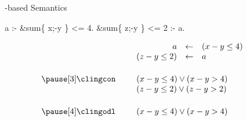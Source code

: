 \begin{frame}[fragile]{\HTC-based Semantics}
  \smallskip
  \begin{semiverbatim}
                            a :- &sum\{ x;-y \} <= 4.
            &sum\{ z;-y \} <= 2 :- a.
  \end{semiverbatim}
  \bigskip\pause
  \[
    \begin{array}{rp{5pt}rclp{20pt}}
                     && a            &\leftarrow&  (x-y\leq 4)         &\\
                     && (z-y\leq 2)  &\leftarrow&  a                   &\\[15pt]\pause[3]
    \text{\clingcon} && \multicolumn{3}{l}{(x-y\leq 4) \vee (x-y > 4)} &\\
                     && \multicolumn{3}{l}{(z-y\leq 2) \vee (z-y>2)}   &\\[15pt]\pause[4]
    \text{\clingodl} && \multicolumn{3}{l}{(x-y\leq 4) \vee (x-y > 4)} &
    \end{array}
  \]
\end{frame}
%

